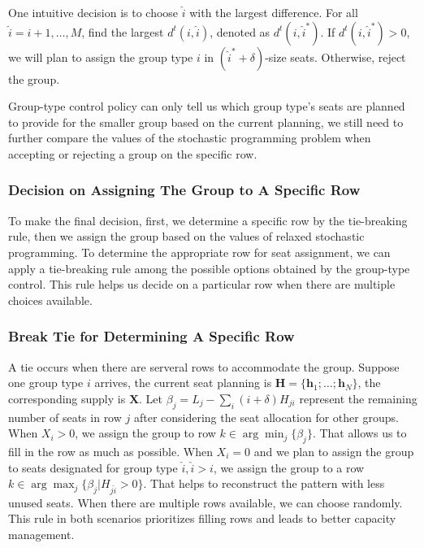 One intuitive decision is to choose $\hat{i}$ with the largest difference. For all $\hat{i} = i+1, \ldots, M$, find the largest $d^{t}(i,\hat{i})$, denoted as $d^{t}(i,\hat{i}^{*})$. If $d^{t}(i,\hat{i}^{*}) >0$, we will plan to assign the group type $i$ in $(\hat{i}^{*}+\delta)$-size seats. Otherwise, reject the group.

Group-type control policy can only tell us which group type's seats are planned to provide for the smaller group based on the current planning, we still need to further compare the values of the stochastic programming problem when accepting or rejecting a group on the specific row. 

\subsubsection{Decision on Assigning The Group to A Specific Row}
To make the final decision, first, we determine a specific row by the tie-breaking rule, then we assign the group based on the values of relaxed stochastic programming. To determine the appropriate row for seat assignment, we can apply a tie-breaking rule among the possible options obtained by the group-type control. This rule helps us decide on a particular row when there are multiple choices available. 

\subsubsection*{Break Tie for Determining A Specific Row}
A tie occurs when there are serveral rows to accommodate the group. Suppose one group type $i$ arrives, the current seat planning is $\bm{H} = \{\bm{h}_{1}; \ldots; \bm{h}_{N}\}$, the corresponding supply is $\bm{X}$. Let $\beta_{j} = L_j - \sum_{i} (i+\delta) H_{ji}$ represent the remaining number of seats in row $j$ after considering the seat allocation for other groups. When $X_{i} > 0$, we assign the group to row $k \in \arg \min_{j} \{\beta_{j}\}$. That allows us to fill in the row as much as possible. When $X_{i} = 0$ and we plan to assign the group to seats designated for group type $\hat{i}, \hat{i}>i$, we assign the group to a row $k \in \arg \max_{j} \{\beta_{j}| H_{j \hat{i}}>0\}$. That helps to reconstruct the pattern with less unused seats. When there are multiple rows available, we can choose randomly. This rule in both scenarios prioritizes filling rows and leads to better capacity management.


